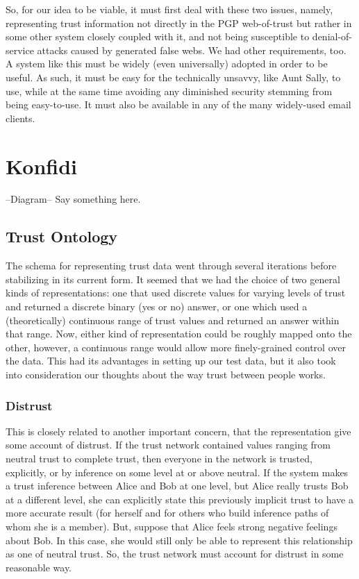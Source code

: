 \documentclass[onecolumn]{acm_proc_article-sp}
\begin{document}
So, for our idea to be viable, it must first deal with these two issues, namely, representing trust information not directly in the PGP web-of-trust but rather in some other system closely coupled with it, and not being susceptible to denial-of-service attacks caused by generated false webs. We had other requirements, too. A system like this must be widely (even universally) adopted in order to be useful. As such, it must be easy for the technically unsavvy, like Aunt Sally, to use, while at the same time avoiding any diminished security stemming from being easy-to-use. It must also be available in any of the many widely-used email clients. 

\section{Konfidi}
--Diagram--
Say something here.

\subsection{Trust Ontology}
The schema for representing trust data went through several iterations before stabilizing in its current form.  It seemed that we had the choice of two general kinds of representations:  one that used discrete values for varying levels of trust and returned a discrete binary (yes or no) answer, or one which used a (theoretically) continuous range of trust values and returned an answer within that range.  Now, either kind of representation could be roughly mapped onto the other, however, a continuous range would allow more finely-grained control over the data.  This had its advantages in setting up our test data, but it also took into consideration our thoughts about the way trust between people works.  

\subsubsection{Distrust}
This is closely related to another important concern, that the representation give some account of distrust.  If the trust network contained values ranging from neutral trust to complete trust, then everyone in the network is trusted, explicitly, or by inference on some level at or above neutral.  If the system makes a trust inference between Alice and Bob at one level, but Alice really trusts Bob at a different level, she can explicitly state this previously implicit trust to have a more accurate result (for herself and for others who build inference paths of whom she is a member).  But, suppose that Alice feels strong negative feelings about Bob.  In this case, she would still only be able to represent this relationship as one of neutral trust.  So, the trust network must account for distrust in some reasonable way.
\end{document}
